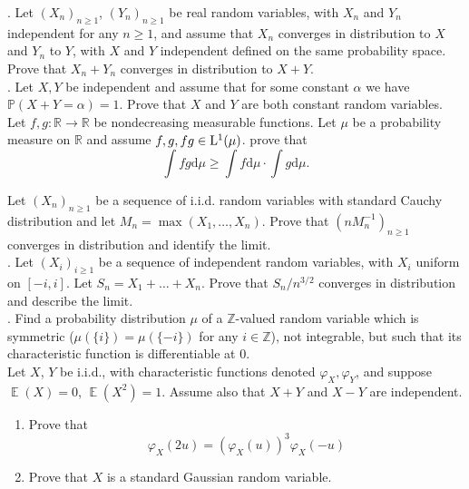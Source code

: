 \documentclass[11pt,reqno]{amsart}
\DeclareMathOperator{\E}{\mathbb{E}}      %
\theoremstyle{definition}
\theoremstyle{remark}
\newcommand{\rd}{{\mathrm{d}}}            %
\newcommand{\1}{\mathds{1}}
\numberwithin{equation}{section}
\begin{document}
.
Let $(X_n)_{n\geq 1}$, $(Y_n)_{n\geq 1}$ be real random variables, with $X_n$ and $Y_n$ independent for any $n\geq 1$, and assume that $X_n$ converges in distribution to $X$ and $Y_n$ to $Y$, with $X$ and $Y$ independent defined on the same probability space. Prove that $X_n+Y_n$
converges in distribution to $X+Y$.\\





.
Let $X,Y$ be independent and assume that for some constant $\alpha$ we have $\mathbb{P}(X+Y=\alpha)=1$. Prove that $X$ and $Y$ are both constant random variables.\\




Let $f,g:\mathbb{R}\to\mathbb{R}$ be nondecreasing measurable functions. Let $\mu$ be a probability measure on $\mathbb{R}$ and assume $f,g,fg\in{\rm L}^1(\mu)$. prove that
$$
\int fg\rd\mu\geq \int f\rd\mu \cdot \int g\rd\mu.
$$



Let $(X_n)_{n\geq 1}$ be a sequence of i.i.d. random variables with standard Cauchy distribution  and let
$M_n=\max(X_1,\dots,X_n).$ Prove that $(n M_n^{-1})_{n\geq 1}$ converges in distribution and identify the limit.\\




. Let $(X_i)_{i\geq 1}$ be a sequence of independent random variables, with $X_i$ uniform on $[-i,i]$.  Let $S_n=X_1+\dots+X_n$.
Prove that $S_n/n^{3/2}$ converges in distribution and describe the limit.\\





.  Find a probability distribution $\mu$ of a $\mathbb{Z}$-valued random variable which is symmetric ($\mu(\{i\})=\mu(\{-i\})$ for any $i\in\mathbb{Z}$),  not integrable,  but such that its characteristic function is differentiable at $0$.\\ 


Let $X$, $Y$ be i.i.d., with characteristic functions denoted $\varphi_X,\varphi_Y$, and suppose $\E(X)=0$, $\E(X^2)=1$. Assume also that $X+Y$ and $X-Y$ are independent.  
\begin{enumerate}
\item Prove that 
$$
\varphi_X(2u)=(\varphi_X(u))^3\varphi_X(-u)
$$
\item Prove that $X$ is a standard Gaussian random variable.
\end{enumerate}
\end{document}
